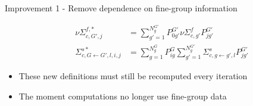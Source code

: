 \documentclass[final]{beamer}
\begin{document}
\begin{frame}{}
\begin{columns}[t]
\begin{column}{.32\linewidth}
\begin{block}{Improvement 1 - Remove dependence on fine-group information}
\begin{itemize}
\begin{equation*}
\begin{split}
                            \nu\Sigma^{f,*}_{c,G',j} &= \sum_{g'=1}^{N_{g}^{G'}}P_{0g'}^{G'}\nu\Sigma^f_{c, g'} P_{jg'}^{G'}\\
                            \Sigma_{c,G\leftarrow G',l,i,j}^{s*} &= \sum_{g=1}^{N_g^{G}}P_{ig}^G\sum_{g'=1}^{N_g^{G'}}\Sigma^s_{c, g\leftarrow g',l}P_{jg'}^{G'}
                        \end{split}
                    \end{equation*}
                    \item These new definitions must still be recomputed every iteration
                    \item The moment computations no longer use fine-group data
                \end{itemize}
            \end{block}
        \end{column}
      

\end{columns}
\end{frame}
\end{document}
